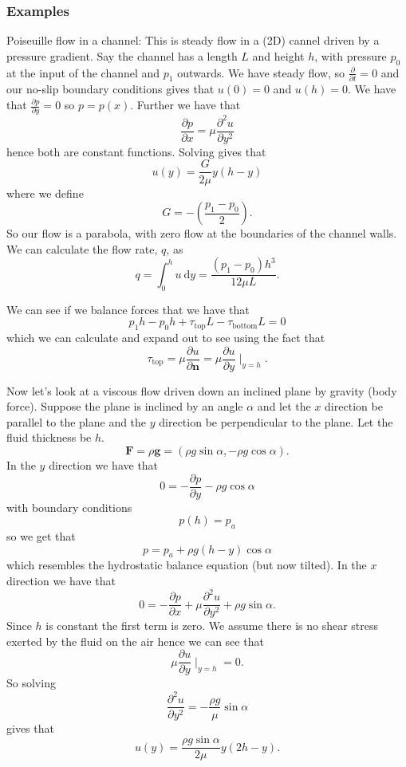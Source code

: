 \documentclass{article}
\begin{document}
\subsubsection{Examples} 
Poiseuille flow in a channel: This is steady flow in a (2D) cannel driven by a pressure gradient. Say the channel has a length $ L $ and height $ h $, with pressure $ p_0 $ at the input of the channel and $ p_1 $ outwards. We have steady flow, so $ \frac \partial{\partial t} = 0 $ and our no-slip boundary conditions gives that $ u(0) = 0 $ and $ u(h) = 0 $. We have that $ \frac{\partial p}{\partial y} = 0 $ so $ p=p(x) $. Further we have that
\[
	\frac{\partial p}{\partial x} = \mu \frac{\partial^2 u}{\partial y^2}
\]
hence both are constant functions. Solving gives that 
\[
	u(y) = \frac G{2\mu} y(h-y)
\]
where we define
\[
	G = -\left(\frac{p_1-p_0}2\right).
\]
So our flow is a parabola, with zero flow at the boundaries of the channel walls. We can calculate the flow rate, $ q $, as
\[
  q = \int_0^h u\ \mathrm dy = \frac{(p_1-p_0)h^3}{12\mu L}.
\]
\begin{remark}
  We can see if we balance forces that we have that
  \[
	  p_1 h - p_0 h + \tau_{\text{top}} L - \tau_{\text{bottom}} L = 0
  \]
  which we can calculate and expand out to see using the fact that
  \[
	  \tau_{\text{top}} = \mu \frac{\partial u}{\partial \mathbf n} = \mu \frac{\partial u}{\partial y}\mid_{y=h}.
  \]
\end{remark}
Now let's look at a viscous flow driven down an inclined plane by gravity (body force). Suppose the plane is inclined by an angle $ \alpha $ and let the $ x $ direction be parallel to the plane and the $ y $ direction be perpendicular to the plane. Let the fluid thickness be $ h $.
\[
  \mathbf F = \rho \mathbf g = (\rho g \sin\alpha, -\rho g \cos\alpha).
\]
In the $ y $ direction we have that
\[
	0 = -\frac{\partial p}{\partial y} - \rho g \cos\alpha
\]
with boundary conditions
\[
	p(h) = p_a
\]
so we get that
\[
  p = p_a +\rho g (h-y)\cos\alpha
\]
which resembles the hydrostatic balance equation (but now tilted). In the $ x $ direction we have that
\[
   0 = -\frac{\partial p}{\partial x} + \mu \frac{\partial^2 u}{\partial y^2} + \rho g \sin \alpha.
\]
Since $ h $ is constant the first term is zero. We assume there is no shear stress exerted by the fluid on the air hence we can see that
\[
	\mu \frac{\partial u}{\partial y}\mid_{y=h} = 0.
\]
So solving
\[
	\frac{\partial^2 u}{\partial y^2} = -\frac{\rho g}\mu \sin\alpha
\]
gives that
\[
	u(y) = \frac{\rho g \sin\alpha}{2\mu } y(2h-y).
\]
\end{document}
